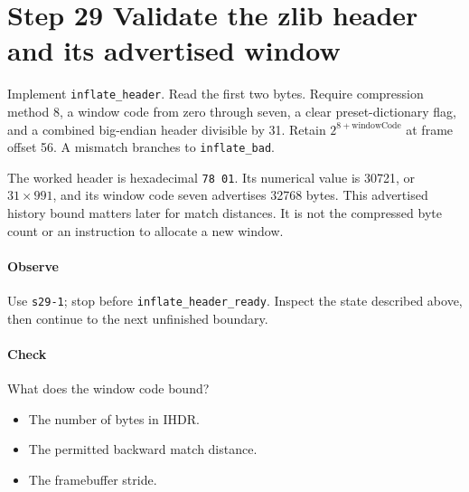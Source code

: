 \section{Step 29 Validate the zlib header and its advertised window}\label{png-inflate-s29}
Implement \texttt{inflate\_header}. Read the first two bytes. Require compression method 8, a window code from zero through seven, a clear preset-dictionary flag, and a combined big-endian header divisible by 31. Retain $2^{8+\mathrm{windowCode}}$ at frame offset 56. A mismatch branches to \texttt{inflate\_bad}.

The worked header is hexadecimal \texttt{78 01}. Its numerical value is 30721, or $31\times991$, and its window code seven advertises 32768 bytes. This advertised history bound matters later for match distances. It is not the compressed byte count or an instruction to allocate a new window.

\paragraph{Observe} Use \texttt{s29-1}; stop before \texttt{inflate\_header\_ready}. Inspect the state described above, then continue to the next unfinished boundary.

\paragraph{Check} What does the window code bound?
\begin{itemize}
  \item[A.] The number of bytes in IHDR.
  \item[B.] The permitted backward match distance.
  \item[C.] The framebuffer stride.
\end{itemize}
